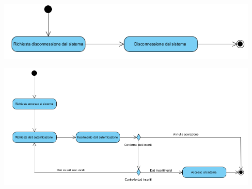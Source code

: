 \begin{center}
	\includegraphics[width=\textwidth]{assets/visualParadigm/attivita/logout}
\end{center}

\begin{center}
	\includegraphics[width=\textwidth]{assets/visualParadigm/attivita/login}
\end{center}

\begin{center}
\end{center}

